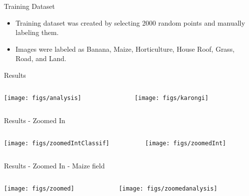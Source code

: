 \documentclass{beamer}
\begin{document}
\begin{frame}{Training Dataset}
	\begin{itemize}
		\item Training dataset was created by selecting 2000 random points and manually labeling them.
		\item Images were labeled as Banana, Maize, Horticulture, House Roof, Grass, Road, and Land.
	\end{itemize}
\end{frame}


\begin{frame}{Results}
\begin{columns}
	\begin{column}{0.5\textwidth}
		\begin{center}
			\texttt{[image: figs/analysis]}
		\end{center}
	\end{column}
	\begin{column}{0.5\textwidth}
		\begin{center}
			\texttt{[image: figs/karongi]}
		\end{center}
	\end{column}
\end{columns}
\end{frame}

\begin{frame}{Results - Zoomed In}
	\begin{columns}
		\begin{column}{0.5\textwidth}
			\begin{center}
				\texttt{[image: figs/zoomedIntClassif]}
			\end{center}
		\end{column}
		\begin{column}{0.5\textwidth}
			\begin{center}
				\texttt{[image: figs/zoomedInt]}
			\end{center}
		\end{column}
	\end{columns}
\end{frame}
\begin{frame}{Results - Zoomed In - Maize field}
\begin{columns}
	\begin{column}{0.5\textwidth}
		\begin{center}
			\texttt{[image: figs/zoomed]}
		\end{center}
	\end{column}
	\begin{column}{0.5\textwidth}
		\begin{center}
			\texttt{[image: figs/zoomedanalysis]}
		\end{center}
	\end{column}
\end{columns}
\end{frame}
\end{document}
